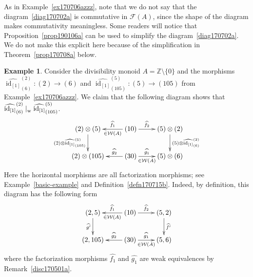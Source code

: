 \documentclass[reqno]{amsart}
\theoremstyle{plain}
\theoremstyle{definition}
\newtheorem{ex}[lem]{Example}
\newcommand{\cat}[1]{\mathcal{#1}}
\newcommand{\catw}{\cat{W}}
\newcommand{\catf}{\cat{F}}
\newcommand{\id}{\operatorname{id}}
\newcommand{\bbz}{\mathbb{Z}}
\numberwithin{equation}{lem}
\newcommand{\divs}{\mid_{\text w}^{}}
\begin{document}
As in Example~\ref{ex170706azzz},
note that we do not say that the diagram~\eqref{diag170702a}
is commutative in $\catf(A)$, since the shape of the diagram makes commutativity meaningless.
Some readers will notice that 
Proposition~\ref{prop190106a} can be used to simplify the diagram~\eqref{diag170702a}.
We do not make this explicit here because of the  simplification in Theorem~\ref{prop170708a} below.

\begin{ex}\label{ex170706a}
Consider the divisibility monoid $A=\bbz\setminus\{0\}$
and the morphisms 
$\widehat{\id_{[1]}}^{(2)}_{(6)}\colon(2)\to(6)$ and $\widehat{\id_{[1]}}^{(5)}_{(105)}\colon(5)\to(105)$
from Example~\ref{ex170706azzz}.
We claim that the following diagram shows that $\widehat{\id_{[1]}}^{(2)}_{(6)}\divs\widehat{\id_{[1]}}^{(5)}_{(105)}$.
$$\xymatrix{
(2)\otimes(5)\ar[d]_-{(2)\otimes\widehat{\id_{[1]}}^{(5)}_{(105)}}
&\ar[l]_-{\widehat{f_1}}^-{\in\catw(A)}(10)\ar[r]^-{\widehat{f_2}}
&(5)\otimes(2)\ar[d]^-{(5)\otimes\widehat{\id_{[1]}}^{(2)}_{(6)}}
\\
(2)\otimes(105)
&\ar[l]_-{\widehat{g_{2}}}(30)\ar[r]^-{\widehat{g_{1}}}_-{\in\catw(A)}
&(5)\otimes(6)
}
$$
Here the horizontal morphisms are all factorization morphisms; see Example~\ref{basic-example} 
and
Definition~\ref{defn170715b}.
Indeed, by definition, this diagram has the following form
\begin{equation}
\label{diag170706b}
\begin{split}
\xymatrix{
(2,5)\ar[d]_-{\widehat{g'}}
&\ar[l]_-{\widehat{f_1}}^-{\in\catw(A)}(10)\ar[r]^-{\widehat{f_2}}
&(5,2)\ar[d]^-{\widehat{f'}}
\\
(2,105)
&\ar[l]_-{\widehat{g_{2}}}(30)\ar[r]^-{\widehat{g_{1}}}_-{\in\catw(A)}
&(5,6)
}
\end{split}
\end{equation}
where 
the factorization morphisms $\widehat{f_1}$ and $\widehat{g_1}$ are weak equivalences by 
Remark~\ref{disc170501a}.
\end{ex}
\end{document}
